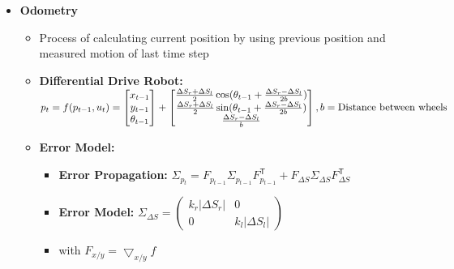 \documentclass[a4paper]{article}
\newcommand{\ides}[1]{\item \textbf{#1}}
\newcommand{\transpose}{\mathsf{T}}
\begin{document}
\begin{itemize}
\begin{itemize}
            \ides{Types:}
        \end{itemize}
    \ides{Odometry}
        \begin{itemize}
            \item Process of calculating current position by using previous position and measured motion of last time step
            \ides{Differential Drive Robot:} $p_t = f(p_{t - 1}, u_t) =
    \begin{bmatrix}
        x_{t - 1}\\
        y_{t - 1}\\
        \theta_{t - 1}
    \end{bmatrix} +
    \begin{bmatrix}
        \frac{\Delta S_r + \Delta S_l}{2} \cos(\theta_{t - 1} + \frac{\Delta S_r - \Delta S_l}{2b})\\
        \frac{\Delta S_r + \Delta S_l}{2} \sin(\theta_{t - 1} + \frac{\Delta S_r - \Delta S_l}{2b})\\
        \frac{\Delta S_r - \Delta S_l}{b}
    \end{bmatrix}, \linebreak b = \text{Distance between wheels}$
            \ides{Error Model:}
                \begin{itemize}
                    \ides{Error Propagation:} $\Sigma_{p_t} = F_{p_{t-1}} \Sigma_{p_{t-1}} F_{p_{t-1}}^\transpose + F_{\Delta S} \Sigma_{\Delta S} F_{\Delta S}^\transpose$
                    \ides{Error Model:} $\Sigma_{\Delta S} =
                        \begin{pmatrix}
                            k_r |\Delta S_r | & 0\\
                            0 & k_l |\Delta S_l|
                        \end{pmatrix}$
                    \item with $F_{x/y} = \bigtriangledown_{x/y} f$
                \end{itemize}
        \end{itemize}
\end{itemize}
\end{document}
